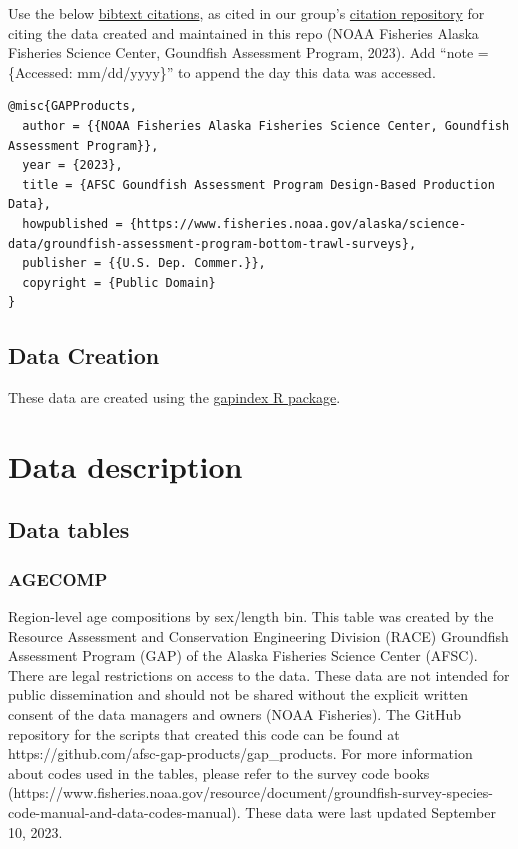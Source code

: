\documentclass[
  letterpaper,
  oneside,
  open=any]{scrbook}
\begin{document}

Use the below
\href{https://github.com/afsc-gap-products/gap_products/blob/main/code/CITATION_GAPProducts.bib}{bibtext
citations}, as cited in our group's
\href{https://github.com/afsc-gap-products/citations/blob/main/cite/bibliography.bib}{citation
repository} for citing the data created and maintained in this repo
(NOAA Fisheries Alaska Fisheries Science Center, Goundfish Assessment
Program, 2023). Add ``note = \{Accessed: mm/dd/yyyy\}'' to append the
day this data was accessed.

\begin{verbatim}
@misc{GAPProducts,
  author = {{NOAA Fisheries Alaska Fisheries Science Center, Goundfish Assessment Program}},
  year = {2023}, 
  title = {AFSC Goundfish Assessment Program Design-Based Production Data},
  howpublished = {https://www.fisheries.noaa.gov/alaska/science-data/groundfish-assessment-program-bottom-trawl-surveys},
  publisher = {{U.S. Dep. Commer.}},
  copyright = {Public Domain} 
}
\end{verbatim}

\hypertarget{data-creation}{%
\section*{Data Creation}\label{data-creation}}


These data are created using the
\href{https://github.com/afsc-gap-products/gapindex}{gapindex R
package}.

\hypertarget{data-description-1}{%
\chapter{Data description}\label{data-description-1}}

\hypertarget{data-tables}{%
\section{Data tables}\label{data-tables}}

\hypertarget{agecomp}{%
\subsection{AGECOMP}\label{agecomp}}

Region-level age compositions by sex/length bin. This table was created
by the Resource Assessment and Conservation Engineering Division (RACE)
Groundfish Assessment Program (GAP) of the Alaska Fisheries Science
Center (AFSC). There are legal restrictions on access to the data. These
data are not intended for public dissemination and should not be shared
without the explicit written consent of the data managers and owners
(NOAA Fisheries). The GitHub repository for the scripts that created
this code can be found at
https://github.com/afsc-gap-products/gap\_products. For more information
about codes used in the tables, please refer to the survey code books
(https://www.fisheries.noaa.gov/resource/document/groundfish-survey-species-code-manual-and-data-codes-manual).
These data were last updated September 10, 2023.
\end{document}
